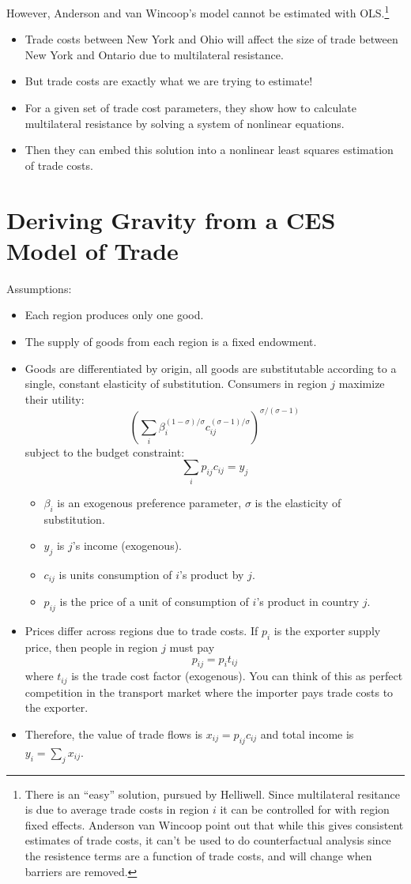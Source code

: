 \documentclass[twoside]{article}
\begin{document}
However, Anderson and van Wincoop's model cannot be estimated with OLS.\footnote{There is an ``easy'' solution, pursued by Helliwell. Since multilateral resitance is due to average trade costs in region $i$ it can be controlled for with region fixed effects. Anderson van Wincoop point out that while this gives consistent estimates of trade costs, it can't be used to do counterfactual analysis since the resistence terms are a function of trade costs, and will change when barriers are removed.}   
\begin{itemize}
\item Trade costs between New York and Ohio will affect the size of trade between New York and Ontario due to multilateral resistance. 
\item But trade costs are exactly what we are trying to estimate!
\item For a given set of trade cost parameters, they show how to calculate multilateral resistance by solving a system of nonlinear equations. 
\item Then they can embed this solution into a nonlinear least squares estimation of trade costs. 
\end{itemize}

\section{Deriving Gravity from a CES Model of Trade}

Assumptions: 
\begin{itemize}
\item Each region produces only one good. 
\item The supply of goods from each region is a fixed endowment.  
\item Goods are differentiated by origin, all goods are substitutable according to a single, constant elasticity of substitution.  Consumers in region $j$ maximize their utility: 
$$ \left( \sum_i \beta_i^{(1-\sigma)/\sigma} c_{ij}^{(\sigma -1)/\sigma} \right)^{\sigma / (\sigma - 1)} $$
subject to the budget constraint:
$$ \sum_i p_{ij} c_{ij} = y_j $$
\begin{itemize}
  \item $\beta_i$ is an exogenous preference parameter, $\sigma$ is the elasticity of substitution. 
  \item $y_j$ is $j$'s income (exogenous).   
  \item $c_{ij}$ is units consumption of $i$'s product by $j$. 
  \item $p_{ij}$ is the price of a unit of consumption of $i$'s product in country $j$. 
\end{itemize}
\item Prices differ across regions due to trade costs. If $p_i$ is the exporter supply price, then people in region $j$ must pay 
$$ p_{ij} = p_i t_{ij} $$
where $t_{ij}$ is the trade cost factor (exogenous). You can think of this as perfect competition in the transport market where the importer pays trade costs to the exporter. 
\item Therefore, the value of trade flows is  $x_{ij} = p_{ij}c_{ij}$ and total income is $y_i = \sum_j x_{ij}$. 
\end{itemize}
\end{document}
